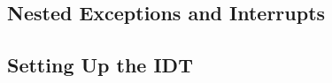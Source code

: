 \documentclass{article}
\begin{document}
\begin{CJK*}{UTF8}{gkai}
\subsection{Nested Exceptions and Interrupts}

\subsection{Setting Up the IDT}

\begin{lstlisting}[style=console]
\end{lstlisting}

\begin{lstlisting}[style=console]
\end{lstlisting}




\begin{lstlisting}[style=ccode, title={\scriptsize \ttfamily \bfseries kern/env.c: env\_create()}]
\end{lstlisting}

\begin{lstlisting}[style=ccode, title={\scriptsize \ttfamily \bfseries kern/env.c: env\_create()}]
\end{lstlisting}

\begin{lstlisting}[style=ccode, title={\scriptsize \ttfamily \bfseries kern/env.c: env\_create()}]
\end{lstlisting}

\begin{lstlisting}[style=ccode, title={\scriptsize \ttfamily \bfseries kern/env.c: env\_create()}]
\end{lstlisting}




\begin{lstlisting}[style=exercise]
\end{lstlisting}

\begin{lstlisting}[style=exercise]
\end{lstlisting}

\begin{lstlisting}[style=exercise]
\end{lstlisting}

\begin{lstlisting}[style=exercise]
\end{lstlisting}






\end{CJK*}
\end{document}
